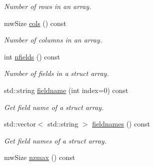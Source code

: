 \begin{DoxyCompactItemize}
\begin{DoxyCompactList}\small\item\em \-Number of rows in an array. \end{DoxyCompactList}\item 
\hypertarget{class_mx_array_a9b48e7ec34f7997d7c8f1d4406acb6cc}{mw\-Size \hyperlink{class_mx_array_a9b48e7ec34f7997d7c8f1d4406acb6cc}{cols} () const }\label{class_mx_array_a9b48e7ec34f7997d7c8f1d4406acb6cc}

\begin{DoxyCompactList}\small\item\em \-Number of columns in an array. \end{DoxyCompactList}\item 
\hypertarget{class_mx_array_aaafc4e535b9825a5690f056024cba34a}{int \hyperlink{class_mx_array_aaafc4e535b9825a5690f056024cba34a}{nfields} () const }\label{class_mx_array_aaafc4e535b9825a5690f056024cba34a}

\begin{DoxyCompactList}\small\item\em \-Number of fields in a struct array. \end{DoxyCompactList}\item 
std\-::string \hyperlink{class_mx_array_ab466ed2945e28f9b13827902132fdc7c}{fieldname} (int index=0) const 
\begin{DoxyCompactList}\small\item\em \-Get field name of a struct array. \end{DoxyCompactList}\item 
std\-::vector$<$ std\-::string $>$ \hyperlink{class_mx_array_ada6d973cd204127af0b0064dff663852}{fieldnames} () const 
\begin{DoxyCompactList}\small\item\em \-Get field names of a struct array. \end{DoxyCompactList}\item 
\hypertarget{class_mx_array_a3b344031fdd065ed3dcbf18fea14d4c0}{mw\-Size \hyperlink{class_mx_array_a3b344031fdd065ed3dcbf18fea14d4c0}{nzmax} () const }\label{class_mx_array_a3b344031fdd065ed3dcbf18fea14d4c0}


\end{DoxyCompactItemize}
